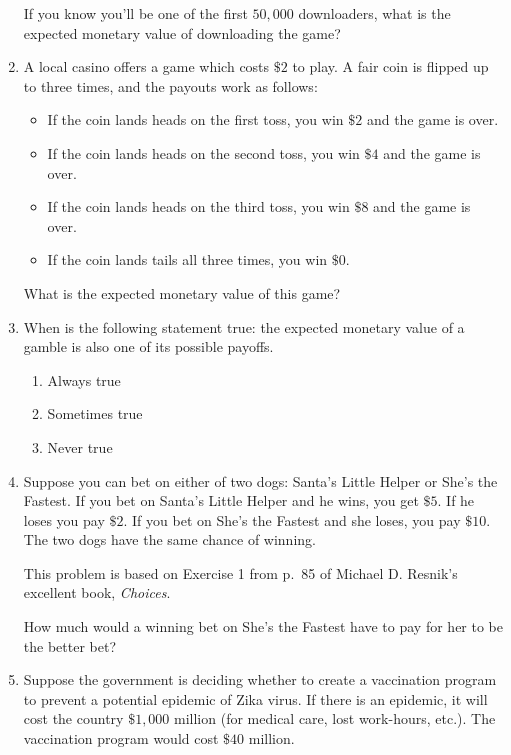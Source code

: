 \documentclass[justified]{tufte-book}
\providecommand{\tightlist}{%
  \setlength{\itemsep}{0pt}\setlength{\parskip}{0pt}}
\theoremstyle{definition}
\theoremstyle{definition}
\theoremstyle{definition}
\theoremstyle{remark}
\begin{document}
\begin{enumerate}
  If you know you'll be one of the first \(50,000\) downloaders, what is the expected monetary value of downloading the game?
\item
  A local casino offers a game which costs \(\$2\) to play. A fair coin is flipped up to three times, and the payouts work as follows:

  \begin{itemize}
  \tightlist
  \item
    If the coin lands heads on the first toss, you win \(\$2\) and the game is over.
  \item
    If the coin lands heads on the second toss, you win \(\$4\) and the game is over.
  \item
    If the coin lands heads on the third toss, you win \(\$8\) and the game is over.
  \item
    If the coin lands tails all three times, you win \(\$0\).
  \end{itemize}

  What is the expected monetary value of this game?
\item
  When is the following statement true: the expected monetary value of a gamble is also one of its possible payoffs.

  \begin{enumerate}
  \def\labelenumii{\alph{enumii}.}
  \tightlist
  \item
    Always true
  \item
    Sometimes true
  \item
    Never true
  \end{enumerate}
\item
  Suppose you can bet on either of two dogs: Santa's Little Helper or She's the Fastest. If you bet on Santa's Little Helper and he wins, you get \(\$5\). If he loses you pay \(\$2\). If you bet on She's the Fastest and she loses, you pay \(\$10\). The two dogs have the same chance of winning.

  \begin{marginfigure}
  This problem is based on Exercise 1 from p.~85 of Michael D. Resnik's
  excellent book, \emph{Choices}.
  \end{marginfigure}

  How much would a winning bet on She's the Fastest have to pay for her to be the better bet?
\item
  Suppose the government is deciding whether to create a vaccination program to prevent a potential epidemic of Zika virus. If there is an epidemic, it will cost the country \(\$1,000\) million (for medical care, lost work-hours, etc.). The vaccination program would cost \(\$40\) million.


\end{enumerate}
\end{document}

